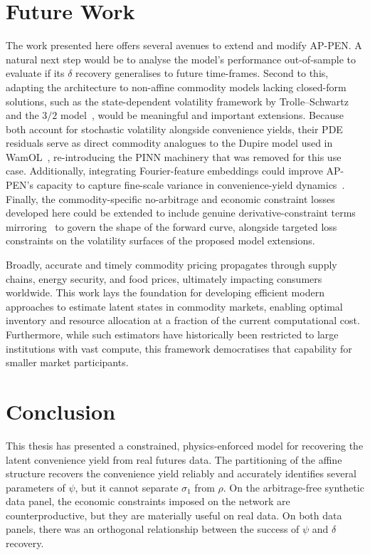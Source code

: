 \documentclass[sigconf, authorversion=true, nonacm=true]{acmart}
\begin{document}
\section{Future Work}
\label{sec:future_work}
The work presented here offers several avenues to extend and modify AP-PEN. A natural next step would be to analyse the model's performance out-of-sample to evaluate if its $\delta$ recovery generalises to future time-frames. Second to this, adapting the architecture to non-affine commodity models lacking closed-form solutions, such as the state-dependent volatility framework by Trolle--Schwartz~\cite{chen2017pricing} and the $3/2$ model~\cite{kouarfate2021explicit}, would be meaningful and important extensions. Because both account for stochastic volatility alongside convenience yields, their PDE residuals serve as direct commodity analogues to the Dupire model used in WamOL~\cite{Hoshisashi2024Whack-a-moleSurface, dupire1994pricing}, re-introducing the PINN machinery that was removed for this use case. Additionally, integrating Fourier-feature embeddings could improve AP-PEN's capacity to capture fine-scale variance in convenience-yield dynamics~\cite{tancik2020fourier}. Finally, the commodity-specific no-arbitrage and economic constraint losses developed here could be extended to include genuine derivative-constraint terms mirroring~\cite{Hoshisashi2024Physics-InformedPDEs} to govern the shape of the forward curve, alongside targeted loss constraints on the volatility surfaces of the proposed model extensions.

Broadly, accurate and timely commodity pricing propagates through supply chains, energy security, and food prices, ultimately impacting consumers worldwide. This work lays the foundation for developing efficient modern approaches to estimate latent states in commodity markets, enabling optimal inventory and resource allocation at a fraction of the current computational cost. Furthermore, while such estimators have historically been restricted to large institutions with vast compute, this framework democratises that capability for smaller market participants.


\section{Conclusion}
\label{sec:conclusion}
This thesis has presented a constrained, physics-enforced model for recovering the latent convenience yield from real futures data. The partitioning of the affine structure recovers the convenience yield reliably and accurately identifies several parameters of $\psi$, but it cannot separate $\sigma_1$ from $\rho$. On the arbitrage-free synthetic data panel, the economic constraints imposed on the network are counterproductive, but they are materially useful on real data. On both data panels, there was an orthogonal relationship between the success of $\psi$ and $\delta$ recovery.
\end{document}
